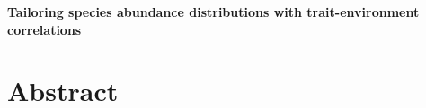 \documentclass[12pt]{article}
\date{}
\begin{document}
\begin{flushleft}
{\Large
{\textbf{Tailoring species abundance distributions with
trait-environment correlations}}
}
\end{flushleft}


\section*{Abstract}

\end{document}
